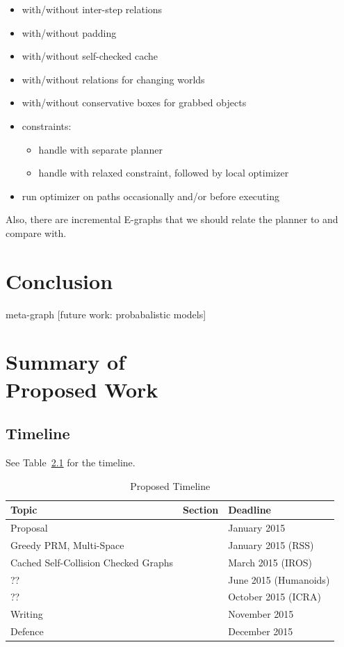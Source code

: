 \documentclass{report}
\begin{document}
\begin{itemize}
\item with/without inter-step relations
\item with/without padding
\item with/without self-checked cache
\item with/without relations for changing worlds
\item with/without conservative boxes for grabbed objects
\item constraints:
   \begin{itemize}
   \item handle with separate planner
   \item handle with relaxed constraint, followed by local optimizer
   \end{itemize}
\item run optimizer on paths occasionally and/or before executing
\end{itemize}

Also, there are incremental E-graphs \cite{phillips2013anytimeegraphs}
that we should relate the planner to and compare with.


\newpage
\chapter{Conclusion}

meta-graph [future work: probabalistic models]


\newpage
\chapter[Summary of Proposed Work]{Summary of\\Proposed Work}

\section{Timeline}

See Table~\ref{table:timeline} for the timeline.

\begin{table}
\centering
\begin{tabular}{lll}
\hline
Topic & Section & Deadline \\
\hline
Proposal & & January 2015 \\
Greedy PRM, Multi-Space & & January 2015 (RSS) \\
Cached Self-Collision Checked Graphs & & March 2015 (IROS) \\
?? & & June 2015 (Humanoids) \\
?? & & October 2015 (ICRA) \\
Writing & & November 2015 \\
Defence & & December 2015 \\
\hline
\end{tabular}
\caption{Proposed Timeline}
\label{table:timeline}
\end{table}
\end{document}
